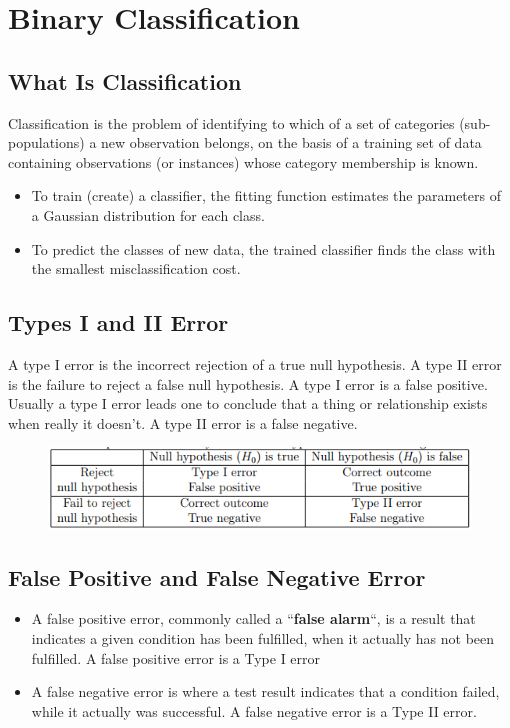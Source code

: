 \documentclass[a4paper,12pt]{article}
\begin{document}
\section*{Binary Classification}
\subsection*{What Is Classification}
Classification is the problem of identifying to which of a set of categories
(sub-populations) a new observation belongs, on the basis of a training set
of data containing observations (or instances) whose category membership is
known. 

\begin{itemize}
	\item  To train (create) a classifier, the fitting function estimates the parameters
	of a Gaussian distribution for each class.
	\item  To predict the classes of new data, the trained classifier finds the class
	with the smallest misclassification cost.
\end{itemize}
\subsection*{Types I and II Error}
A type I error is the incorrect rejection of a true null hypothesis. A type
II error is the failure to reject a false null hypothesis. A type I error is a
false positive. Usually a type I error leads one to conclude that a thing or
relationship exists when really it doesn’t. A type II error is a false negative.
\begin{figure}[h!]
	\centering
	\includegraphics[width=0.7\linewidth]{Table}
\end{figure}

\subsection*{False Positive and False Negative Error}

\begin{itemize}
	\item 
	A false positive error, commonly called a ``\textbf{false alarm}``, is a result that indicates
	a given condition has been fulfilled, when it actually has not been
	fulfilled. A false positive error is a Type I error %
	\item  A false negative error is where a test result indicates that a condition
	failed, while it actually was successful. A false negative error is a Type II
	error.%
\end{itemize}
\end{document}
